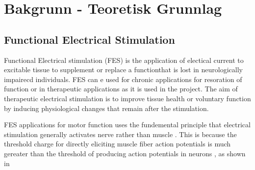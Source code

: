 
\section{Bakgrunn - Teoretisk Grunnlag}



\subsection{Functional Electrical Stimulation}
Functional Electrical stimulation (FES) is the application of electical current to excitable tissue to supplement or replace a functionthat is lost in neurologically impairecd individuals. FES can e used for chronic applications for resoration of function or in therapeutic applications as it is used in the project. The aim of therapeutic electrical stimulation is to improve tissue health or voluntary function by inducing physiological changes that remain after the stimulation.

FES applications for motor function uses the fundemental principle that electrical stimulation generally activates nerve rather than muscle \cite{peckham_functional_2005}. This is because the threshold charge for directly eliciting muscle fiber action potentials is much gereater than the threshold of producing action potentials in neurons \cite{mortimer_motor_2011}, as shown in 




